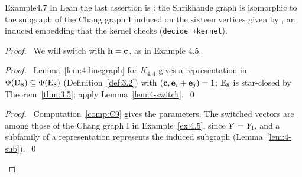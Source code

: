 \begin{cgss}{Example}{4.7}\label{ex:4.7}
 In Lean the last assertion is : the
 Shrikhande graph is isomorphic to the subgraph of the Chang graph I induced on the sixteen
 vertices given by , an induced embedding that the
 kernel checks (\texttt{decide +kernel}).
\end{cgss}
\begin{proof}
 \pfsketch\ We will switch with ${\mathbf h}={\mathbf c}$, as in Example 4.5.
 \begin{proof}\pf\ Lemma~\ref{lem:4-linegraph} for $K_{4,4}$ gives a representation in
  $\Phi(\mathrm{D}_8)\subseteq\Phi(\mathrm{E}_8)$ (Definition~\ref{def:3.2}) with $({\mathbf c},{\mathbf e}_i+{\mathbf e}_j)=1$; $\mathrm{E}_8$ is star-closed by Theorem~\ref{thm:3.5}; apply Lemma~\ref{lem:4-switch}.~\qed\end{proof}
 \qedstep
 \begin{proof}\pf\ Computation~\ref{comp:C9} gives the parameters. The switched vectors are among
  those of the Chang graph I in Example~\ref{ex:4.5}, since $Y=Y_{\rm I}$, and a subfamily of a
  representation represents the induced subgraph (Lemma~\ref{lem:4-sub}).~\qed\end{proof}
\end{proof}

